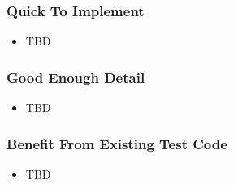 \begin{frame}
  \frametitle{Quick To Implement}
  \begin{itemize}
    \item TBD
  \end{itemize}
\end{frame}

\begin{frame}
  \frametitle{Good Enough Detail}
  \begin{itemize}
    \item TBD
  \end{itemize}
\end{frame}

\begin{frame}
  \frametitle{Benefit From Existing Test Code}
  \begin{itemize}
    \item TBD
  \end{itemize}
\end{frame}
